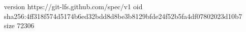 version https://git-lfs.github.com/spec/v1
oid sha256:4ff318f574d5174b6ed32bdd8d8be3b8129bfde24f52b5fa4df07802023d10b7
size 72306
